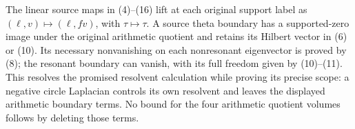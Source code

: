 The linear source maps in (4)--(16) lift at each original support
label as \((\ell,v)\mapsto(\ell,fv)\), with
\(\tau\mapsto\tau\). A source theta boundary has a supported-zero
image under the original arithmetic quotient and retains its
Hilbert vector in (6) or (10). Its necessary nonvanishing on each
nonresonant eigenvector is proved by (8); the resonant boundary can
vanish, with its full freedom given by (10)--(11). This resolves the promised
resolvent calculation while proving its precise scope: a negative
circle Laplacian controls its own resolvent and leaves the displayed
arithmetic boundary terms. No bound for the four arithmetic quotient
volumes follows by deleting those terms.
\endgroup

